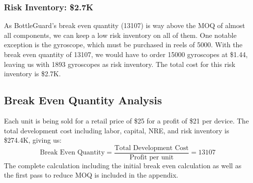 \documentclass[12pt]{article}
\begin{document}
	\subsubsection*{Risk Inventory: \$2.7K}
	As BottleGuard’s break even quantity (13107) is way above the MOQ of almost all components, we can keep a low risk inventory on all of them. One notable exception is the gyroscope, which must be purchased in reels of 5000. With the break even quantity of 13107, we would have to order 15000 gyroscopes at \$1.44, leaving us with 1893 gyroscopes as risk inventory. The total cost for this risk inventory is \$2.7K. 
	
	\subsection*{Break Even Quantity Analysis}
	Each unit is being sold for a retail price of \$25 for a profit of \$21 per device. The total development cost including labor, capital, NRE, and risk inventory is \$274.4K, giving us:
	\[ \text{Break Even Quantity} = \frac{\text{Total Development Cost}}{\text{Profit per unit}} = 13107 \] 
	The complete calculation including the initial break even calculation as well as the first pass to reduce MOQ is included in the appendix.
	
\end{document}

